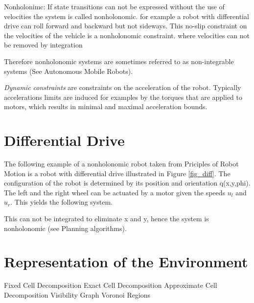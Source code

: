 Nonholonimc:
If state transitions can not be expressed without the use of velocities the system is called nonholonomic.
for example a robot with differential drive can roll forward and backward but not sideways. 
This no-slip constraint on the velocities of the vehicle is a nonholonomic constraint.
where velocities can not be removed by integration 

Therefore nonholonomic systems are sometimes referred to as non-integrable systems (See Autonomous Mobile Robots).

\emph{Dynamic constraints} are constraints on the acceleration of the robot. Typically accelerations limits are induced for examples by the torques that are applied to motors, which results in minimal and maximal acceleration bounds.

\section{Differential Drive}\label{sec:ddrive}
The following example of a nonholonomic robot taken from Priciples of Robot Motion is a robot with differential drive illustrated in Figure \ref{fig_diff}.
The configuration of the robot is determined by its position and orientation q(x,y,phi).
The left and the right wheel can be actuated by a motor given the speeds $u_l$ and $u_r$.
This yields the following system.

This can not be integrated to eliminate x and y, hence the system is nonholonomic (see Planning algorithms).

\section{Representation of the Environment}\label{sec:representation}
Fixed Cell Decomposition
Exact Cell Decomposition
Approximate Cell Decomposition
Visibility Graph
Voronoi Regions

